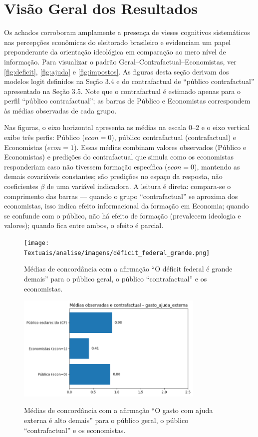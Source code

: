 \chapter{Visão Geral dos Resultados}
Os achados corroboram amplamente a presença de vieses cognitivos sistemáticos nas percepções econômicas do eleitorado brasileiro e evidenciam um papel preponderante da orientação ideológica em comparação ao mero nível de informação. Para visualizar o padrão Geral–Contrafactual–Economistas, ver \autoref{fig:deficit}, \autoref{fig:ajuda} e \autoref{fig:impostos}. As figuras desta seção derivam dos modelos logit definidos na Seção 3.4 e do contrafactual de “público contrafactual” apresentado na Seção 3.5. Note que o contrafactual é estimado apenas para o perfil “público contrafactual”; as barras de Público e Economistas correspondem às médias observadas de cada grupo.

Nas figuras, o eixo horizontal apresenta as médias na escala 0–2 e o eixo vertical exibe três perfis: Público ($\textit{econ}=0$), público contrafactual (contrafactual) e Economistas ($\textit{econ}=1$). Essas médias combinam valores observados (Público e Economistas) e predições do contrafactual que simula como os economistas responderiam caso não tivessem formação específica ($\textit{econ}=0$), mantendo as demais covariáveis constantes; são predições no espaço da resposta, não coeficientes $\beta$ de uma variável indicadora. A leitura é direta: compara-se o comprimento das barras — quando o grupo “contrafactual” se aproxima dos economistas, isso indica efeito informacional da formação em Economia; quando se confunde com o público, não há efeito de formação (prevalecem ideologia e valores); quando fica entre ambos, o efeito é parcial.


\begin{figure}[htbp]
\centering
\caption{Médias de concordância com a afirmação ``O déficit federal é grande demais'' para o público geral, o público ``contrafactual'' e os economistas.}
\texttt{[image: Textuais/analise/imagens/déficit\_federal\_grande.png]}
\notafig
\label{fig:deficit}
\end{figure}

\begin{figure}[htbp]
\centering
\caption{Médias de concordância com a afirmação ``O gasto com ajuda externa é alto demais'' para o público geral, o público ``contrafactual'' e os economistas.}
\includegraphics[width=0.8\textwidth]{Textuais/analise/imagens/gasto_ajuda_externa.png}
\notafig
\label{fig:ajuda}
\end{figure}

